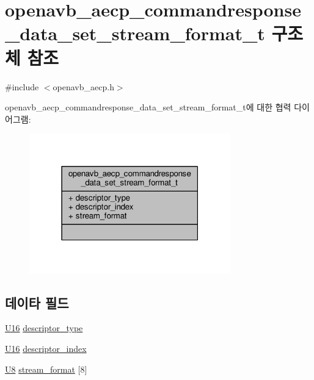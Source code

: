 \hypertarget{structopenavb__aecp__commandresponse__data__set__stream__format__t}{}\section{openavb\+\_\+aecp\+\_\+commandresponse\+\_\+data\+\_\+set\+\_\+stream\+\_\+format\+\_\+t 구조체 참조}
\label{structopenavb__aecp__commandresponse__data__set__stream__format__t}


{\ttfamily \#include $<$openavb\+\_\+aecp.\+h$>$}



openavb\+\_\+aecp\+\_\+commandresponse\+\_\+data\+\_\+set\+\_\+stream\+\_\+format\+\_\+t에 대한 협력 다이어그램\+:
\nopagebreak
\begin{figure}[H]
\begin{center}
\leavevmode
\includegraphics[width=247pt]{structopenavb__aecp__commandresponse__data__set__stream__format__t__coll__graph}
\end{center}
\end{figure}
\subsection*{데이타 필드}
\begin{DoxyCompactItemize}
\item 
\hyperlink{openavb__types__base__pub_8h_a0a0a322d5fa4a546d293a77ba8b4a71f}{U16} \hyperlink{structopenavb__aecp__commandresponse__data__set__stream__format__t_a1e231d7874aada5925b29affc76782cc}{descriptor\+\_\+type}
\item 
\hyperlink{openavb__types__base__pub_8h_a0a0a322d5fa4a546d293a77ba8b4a71f}{U16} \hyperlink{structopenavb__aecp__commandresponse__data__set__stream__format__t_ab26fb363c24b9a2a4391f9171c981b08}{descriptor\+\_\+index}
\item 
\hyperlink{openavb__types__base__pub_8h_aa63ef7b996d5487ce35a5a66601f3e73}{U8} \hyperlink{structopenavb__aecp__commandresponse__data__set__stream__format__t_a574c1a5d46fe953da8f394d622e1da8e}{stream\+\_\+format} \mbox{[}8\mbox{]}
\end{DoxyCompactItemize}


